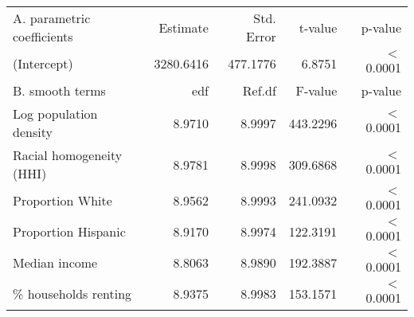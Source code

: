 \begin{table}[ht]
\centering
\begin{tabular}{lrrrr}
   \hline
A. parametric coefficients & Estimate & Std. Error & t-value & p-value \\ 
  (Intercept) & 3280.6416 & 477.1776 & 6.8751 & $<$ 0.0001 \\ 
   \hline
B. smooth terms & edf & Ref.df & F-value & p-value \\ 
  Log population density & 8.9710 & 8.9997 & 443.2296 & $<$ 0.0001 \\ 
  Racial homogeneity (HHI) & 8.9781 & 8.9998 & 309.6868 & $<$ 0.0001 \\ 
  Proportion White & 8.9562 & 8.9993 & 241.0932 & $<$ 0.0001 \\ 
  Proportion Hispanic & 8.9170 & 8.9974 & 122.3191 & $<$ 0.0001 \\ 
  Median income & 8.8063 & 8.9890 & 192.3887 & $<$ 0.0001 \\ 
  \% households renting & 8.9375 & 8.9983 & 153.1571 & $<$ 0.0001 \\ 
   \hline
\end{tabular}
\caption{ } 
\label{Demographic GAM}
\end{table}
